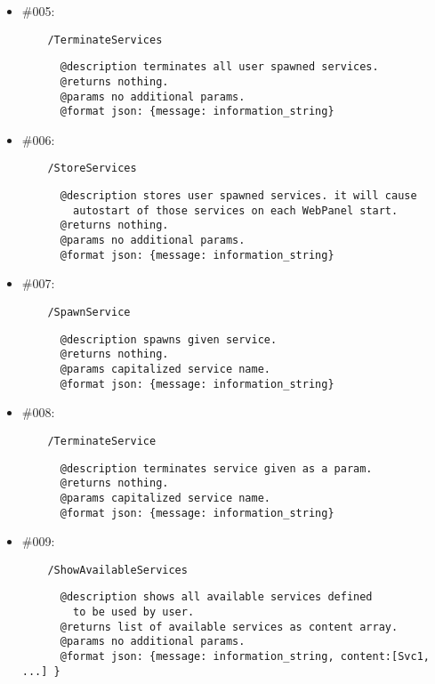 \documentclass[11pt,a4paper]{scrartcl}
\begin{document}
\begin{itemize}
    \item \#005:
      \begin{verbatim}
    /TerminateServices
      \end{verbatim}
      \begin{verbatim}
      @description terminates all user spawned services.
      @returns nothing.
      @params no additional params.
      @format json: {message: information_string}
      \end{verbatim}

    \item \#006:
      \begin{verbatim}
    /StoreServices
      \end{verbatim}
      \begin{verbatim}
      @description stores user spawned services. it will cause
        autostart of those services on each WebPanel start.
      @returns nothing.
      @params no additional params.
      @format json: {message: information_string}
      \end{verbatim}

    \item \#007:
      \begin{verbatim}
    /SpawnService
      \end{verbatim}
      \begin{verbatim}
      @description spawns given service.
      @returns nothing.
      @params capitalized service name.
      @format json: {message: information_string}
      \end{verbatim}

    \item \#008:
      \begin{verbatim}
    /TerminateService
      \end{verbatim}
      \begin{verbatim}
      @description terminates service given as a param.
      @returns nothing.
      @params capitalized service name.
      @format json: {message: information_string}
      \end{verbatim}

    \item \#009:
      \begin{verbatim}
    /ShowAvailableServices
      \end{verbatim}
      \begin{verbatim}
      @description shows all available services defined
        to be used by user.
      @returns list of available services as content array.
      @params no additional params.
      @format json: {message: information_string, content:[Svc1, ...] }
      \end{verbatim}


\end{itemize}
\end{document}
